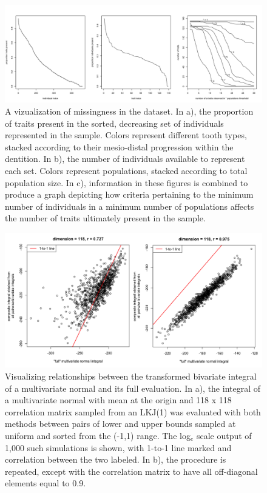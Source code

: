 \documentclass[12pt, twocolumn, twoside]{article}
\begin{document}
\begin{figure}[h]
\centering
\includegraphics[width=185mm]{figures/chpt4_figure1.png}
\caption{A vizualization of missingness in the dataset. In a), the proportion of traits present in the sorted, decreasing set of individuals represented in the sample. Colors represent different tooth types, stacked according to their mesio-distal progression within the dentition. In b), the number of individuals available to represent each set. Colors represent populations, stacked according to total population size. In c), information in these figures is combined to produce a graph depicting how criteria pertaining to the minimum number of individuals in a minimum number of populations affects the number of traits ultimately present in the sample. \label{overflow}}
\end{figure}

\begin{figure}[h]
\centering
\includegraphics[width=185mm]{figures/chpt4_figure2.png}
\caption{Visualizing relationships between the transformed bivariate integral of a multivariate normal and its full evaluation. In a), the integral of a multivariate normal with mean at the origin and 118 x 118 correlation matrix sampled from an LKJ(1) was evaluated with both methods between pairs of lower and upper bounds sampled at uniform and sorted from the (-1,1) range. The log$_e$ scale output of 1,000 such simulations is shown, with 1-to-1 line marked and correlation between the two labeled. In b), the procedure is repeated, except with the correlation matrix to have all off-diagonal elements equal to 0.9.  \label{overflow}}
\end{figure}
\end{document}
